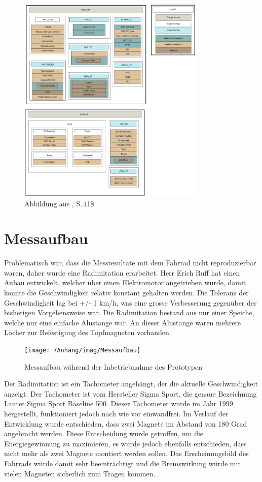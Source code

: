 \begin{figure}[h]
    \includegraphics [width=0.8\textwidth]{7Anhang/imag/powerDomain_2.png} 
     \caption{Abbildung aus \cite{Sensortag_Manual}, S.\,418}
     \label{a_powerdomain}
\end{figure}

\chapter{Messaufbau}
\label{messaufbau}
Problematisch war, dass die Messresultate mit dem Fahrrad nicht reproduzierbar waren, daher wurde eine Radimitation erarbeitet. Herr Erich Ruff hat einen Aubau entwickelt, welcher über einen Elektromotor angetrieben wurde, damit konnte die Geschwindigkeit relativ konstant gehalten werden. Die Toleranz der Geschwindigkeit lag bei +/- 1 km/h, was eine grosse Verbesserung gegenüber der bisherigen Vorgehensweise war. Die Radimitation bestand aus nur einer Speiche, welche nur eine einfache Alustange war. An dieser Alustange waren mehrere Löcher zur Befestigung des Topfmagneten vorhanden.

\begin{figure}[ht]
    \texttt{[image: 7Anhang/imag/Messaufbau]}
	\caption{Messaufbau während der Inbetriebnahme des Prototypen}
	\label{messaufbau_anhang}
\end{figure}

Der Radimitation ist ein Tachometer angehängt, der die aktuelle Geschwindigkeit anzeigt. Der Tachometer ist vom Hersteller Sigma Sport, die genaue Bezeichnung Lautet Sigma Sport Baseline 500. Dieser Tachometer wurde im Jahr 1999 hergestellt, funktioniert jedoch nach wie vor einwandfrei. Im Verlauf der Entwicklung wurde entschieden, dass zwei Magnete im Abstand von 180 Grad angebracht werden. Diese Entscheidung wurde getroffen, um die Energiegewinnung zu maximieren, es wurde jedoch ebenfalls entschieden, dass nicht mehr als zwei Magnete montiert werden sollen. Das Erscheinungsbild des Fahrrads würde damit sehr beeinträchtigt und die Bremswirkung würde mit vielen Magneten sicherlich zum Tragen kommen.

